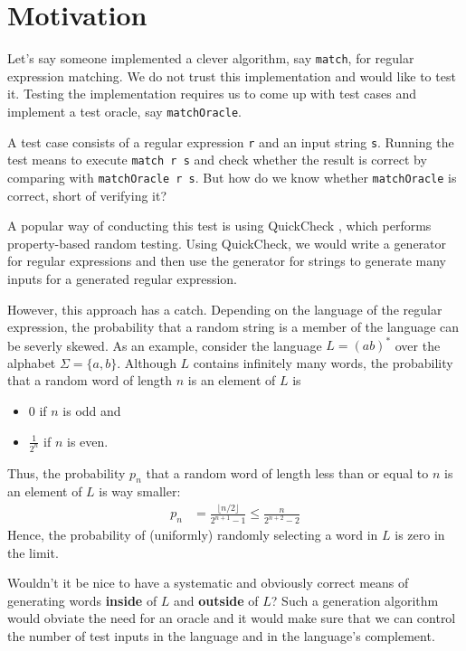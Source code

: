 \section{Motivation}
\label{sec:motivation}

Let's say someone implemented a clever algorithm, say \texttt{match}, for
regular expression matching. 
We do not trust this implementation and would like to test it.
Testing the implementation requires us to come up with test cases and
implement a test oracle, say \texttt{matchOracle}.

A test case consists of a regular expression \texttt{r} and an input
string \texttt{s}. Running the test means to execute \texttt{match r
  s} and check whether the result is correct by comparing with
\texttt{matchOracle r s}. But how do we know whether
\texttt{matchOracle} is correct, short of verifying it?

A popular way of conducting this test is using QuickCheck
\cite{quickcheck}, which performs property-based random testing. Using
QuickCheck, we would write a generator for regular expressions and then
use the generator for strings to generate many inputs for a
generated regular expression.

However, this approach has a
catch. Depending on the language of the regular expression, the
probability that a random string is a member of the language can be
severly skewed. As an example, consider the language $L = (ab)^*$ over the
alphabet $\Sigma = \{a, b\}$. Although $L$ contains infinitely many
words, the probability that a random word of
length $n$ is an element of $L$ is
\begin{itemize}
\item $0$ if $n$ is odd and
\item $\frac{1}{2^n}$ if $n$ is even.
\end{itemize}
Thus, the probability $p_n$ that a random word of length less than or equal to
$n$ is an element of $L$ is way smaller:
\begin{align*}
  p_n &= \frac{\lfloor n/2 \rfloor}{2^{n+1} - 1}
        \le \frac{n}{2^{n+2} - 2}
\end{align*}
Hence, the probability of (uniformly) randomly
selecting a word in $L$ is zero in the limit.

Wouldn't it be nice to have a systematic and obviously correct means
of generating words \textbf{inside} of $L$ and \textbf{outside} of
$L$? Such a generation algorithm would obviate the need for an oracle
and it would make sure that we can control the number of test inputs
in the language and in the language's complement.

